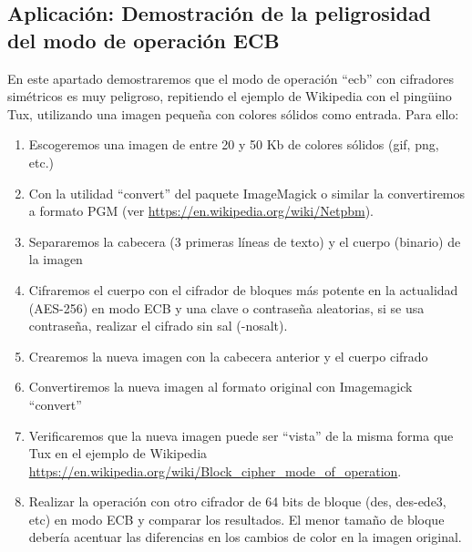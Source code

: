 \subsection{Aplicación: Demostración de la peligrosidad del modo de operación ECB}
En este apartado demostraremos que el modo de operación “ecb” con cifradores simétricos es muy
peligroso, repitiendo el ejemplo de Wikipedia con el pingüino Tux, utilizando una imagen pequeña
con colores sólidos como entrada. Para ello:
\begin{enumerate}
    \item Escogeremos una imagen de entre 20 y 50 Kb de colores sólidos (gif, png, etc.)
    \item Con la utilidad “convert” del paquete ImageMagick o similar la convertiremos a formato PGM
    (ver \url{https://en.wikipedia.org/wiki/Netpbm}).
    \item Separaremos la cabecera (3 primeras líneas de texto) y el cuerpo (binario) de la imagen
    \item Cifraremos el cuerpo con el cifrador de bloques más potente en la actualidad (AES-256) en modo
    ECB y una clave o contraseña aleatorias, si se usa contraseña, realizar el cifrado sin sal (-nosalt).
    \item Crearemos la nueva imagen con la cabecera anterior y el cuerpo cifrado
    \item Convertiremos la nueva imagen al formato original con Imagemagick “convert”
    \item Verificaremos que la nueva imagen puede ser “vista” de la misma forma que Tux en el ejemplo
    de Wikipedia \url{https://en.wikipedia.org/wiki/Block_cipher_mode_of_operation}.
    \item Realizar la operación con otro cifrador de 64 bits de bloque (des, des-ede3, etc) en modo ECB
    y comparar los resultados. El menor tamaño de bloque debería acentuar las diferencias en los
    cambios de color en la imagen original.
\end{enumerate}
